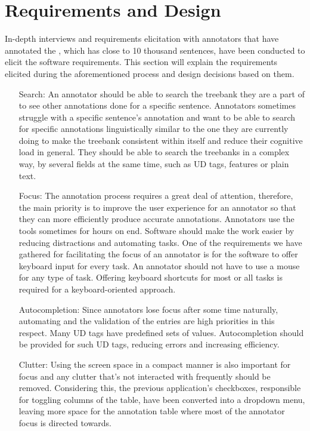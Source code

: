 \section{Requirements and Design}
\label{sec:requirements}

In-depth interviews and requirements elicitation with annotators that have annotated the \bountreebank{}, which has close to 10 thousand sentences, have been conducted to elicit the software requirements.
This section will explain the requirements elicited during the aforementioned process and design decisions based on them.

\begin{itemize}[before=\normalfont, font=\itshape, align=left]
\item[Search:]
An annotator should be able to search the treebank they are a part of to see other annotations done for a specific sentence.
Annotators sometimes struggle with a specific sentence's annotation and want to be able to search for specific annotations linguistically similar to the one they are currently doing to make the treebank consistent within itself and reduce their cognitive load in general.
They should be able to search the treebanks in a complex way, by several fields at the same time, such as UD tags, features or plain text.

\item[Focus:]
The annotation process requires a great deal of attention, therefore, the main priority is to improve the user experience for an annotator so that they can more efficiently produce accurate annotations.
Annotators use the tools sometimes for hours on end.
Software should make the work easier by reducing distractions and automating tasks.
One of the requirements we have gathered for facilitating the focus of an annotator is for the software to offer keyboard input for every task.
An annotator should not have to use a mouse for any type of task.
Offering keyboard shortcuts for most or all tasks is required for a keyboard-oriented approach.

\item[Autocompletion:]
Since annotators lose focus after some time naturally, automating and the validation of the entries are high priorities in this respect.
Many UD tags have predefined sets of values.
Autocompletion should be provided for such UD tags, reducing errors and increasing efficiency.

\item[Clutter:]
Using the screen space in a compact manner is also important for focus and any clutter that's not interacted with frequently should be removed.
Considering this, the previous application's checkboxes, responsible for toggling columns of the table, have been converted into a dropdown menu, leaving more space for the annotation table where most of the annotator focus is directed towards.


\end{itemize}
